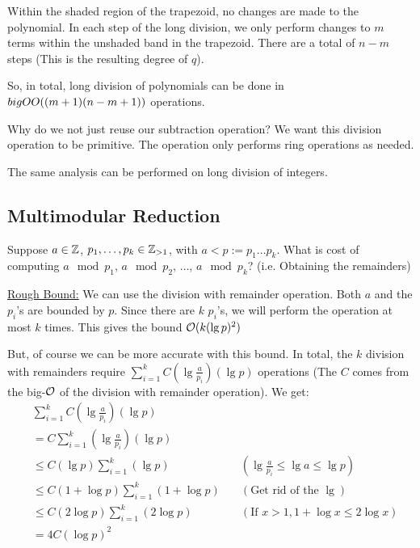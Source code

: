 Within the shaded region of the trapezoid, no changes are made to the polynomial.
In each step of the long division, we only perform changes to $m$ terms within the unshaded band in the trapezoid.
There are a total of $n-m$ steps (This is the resulting degree of $q$).

So, in total, long division of polynomials can be done in $\\bigO{O}((m+1)(n-m+1))$ operations.

\begin{note}
    Why do we not just reuse our subtraction operation? We want this division operation to be primitive. The operation only performs ring operations as needed.
\end{note}

The same analysis can be performed on long division of integers.

\subsection{Multimodular Reduction}
Suppose $a \in \operatorname{\mathbb{Z}}$, $p_1, \ldots, p_k \in \operatorname{\mathbb{Z}}_{> 1}$, with $a < p := p_1\ldots p_k$. What is cost of computing $a \mod p_1$, $a \mod p_2$, $\ldots$, $a \mod p_k$? (i.e. Obtaining the remainders)

\underline{Rough Bound:} We can use the division with remainder operation.
Both $a$ and the $p_i$'s are bounded by $p$.
Since there are $k$ $p_i$'s, we will perform the operation at most $k$ times.
This gives the bound $\operatorname{\mathcal{O}}(k(\lg p)^2)$

But, of course we can be more accurate with this bound.
In total, the $k$ division with remainders require $\sum_{i = 1}^k C\left(\lg \frac{a}{p_i}\right)\left(\lg p\right)$ operations (The $C$ comes from the big-$\operatorname{\mathcal{O}}$ of the division with remainder operation).
We get:
\begin{equation*}
\begin{aligned}
    &\sum_{i = 1}^k C\left(\lg \frac{a}{p_i}\right)\left(\lg p\right)\\
    &= C \sum_{i = 1}^k \left(\lg \frac{a}{p_i}\right)\left(\lg p\right) \\
    &\leq C \left(\lg p\right) \sum_{i = 1}^k \left(\lg p\right) \quad &(\lg \frac{a}{p_i} \leq \lg a \leq \lg p) \\
    &\leq C (1 + \log p) \sum_{i = 1}^k (1 + \log p) \quad & (\text{Get rid of the }\lg)\\
    &\leq C (2\log p) \sum_{i = 1}^k (2\log p) \quad & (\text{If } x > 1, 1 + \log x \leq 2\log x)\\
    &=4C(\log p)^2
\end{aligned}
\end{equation*}